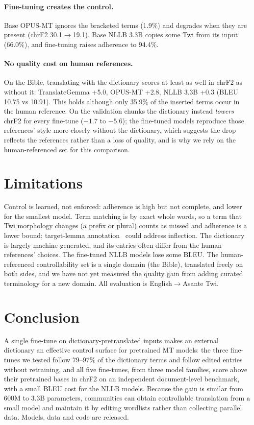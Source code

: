 \documentclass[10pt,twocolumn]{article}
\begin{document}
\paragraph{Fine-tuning creates the control.} Base OPUS-MT ignores the bracketed terms (1.9\%) and degrades when they are present (chrF2 30.1$\rightarrow$19.1). Base NLLB 3.3B copies some Twi from its input (66.0\%), and fine-tuning raises adherence to 94.4\%.

\paragraph{No quality cost on human references.} On the Bible, translating with the dictionary scores at least as well in chrF2 as without it: TranslateGemma +5.0, OPUS-MT +2.8, NLLB 3.3B +0.3 (BLEU 10.75 vs 10.91). This holds although only 35.9\% of the inserted terms occur in the human reference. On the validation chunks the dictionary instead \emph{lowers} chrF2 for every fine-tune ($-1.7$ to $-5.6$); the fine-tuned models reproduce those references' style more closely without the dictionary, which suggests the drop reflects the references rather than a loss of quality, and is why we rely on the human-referenced set for this comparison.

\section{Limitations}

Control is learned, not enforced: adherence is high but not complete, and lower for the smallest model. Term matching is by exact whole words, so a term that Twi morphology changes (a prefix or plural) counts as missed and adherence is a lower bound; target-lemma annotation~\cite{bergmanis2021facilitating} could address inflection. The dictionary is largely machine-generated, and its entries often differ from the human references' choices. The fine-tuned NLLB models lose some BLEU. The human-referenced controllability set is a single domain (the Bible), translated freely on both sides, and we have not yet measured the quality gain from adding curated terminology for a new domain. All evaluation is English$\rightarrow$Asante Twi.

\section{Conclusion}

A single fine-tune on dictionary-pretranslated inputs makes an external dictionary an effective control surface for pretrained MT models: the three fine-tunes we tested follow 79--97\% of the dictionary terms and follow edited entries without retraining, and all five fine-tunes, from three model families, score above their pretrained bases in chrF2 on an independent document-level benchmark, with a small BLEU cost for the NLLB models. Because the gain is similar from 600M to 3.3B parameters, communities can obtain controllable translation from a small model and maintain it by editing wordlists rather than collecting parallel data. Models, data and code are released.



\end{document}
